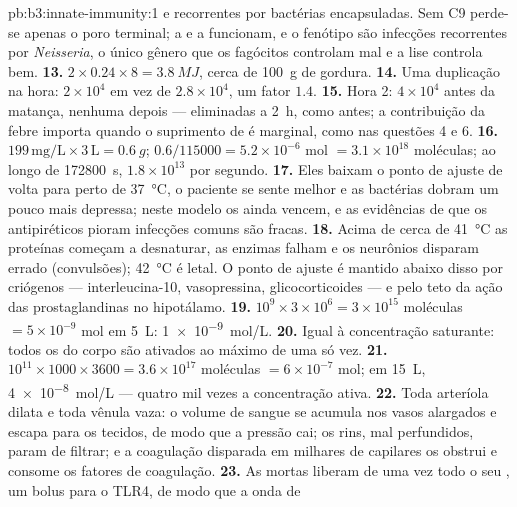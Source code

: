 \begin{solution}{pb:b3:innate-immunity:1}
e recorrentes por bactérias encapsuladas. Sem C9 perde-se apenas o poro
terminal; a  e a  funcionam, e o fenótipo são
infecções recorrentes por \emph{Neisseria}, o único gênero que os
fagócitos controlam mal e a lise controla bem.
\textbf{13.} $2\times 0.24\times 8 = \qty{3.8}{MJ}$, cerca de
\qty{100}{g} de gordura.
\textbf{14.} Uma duplicação na hora: $2\times 10^{4}$ em vez de
$2.8\times 10^{4}$, um fator $1.4$.
\textbf{15.} Hora 2: $4\times 10^{4}$ antes da matança, nenhuma depois
--- eliminadas a \qty{2}{h}, como antes; a contribuição da febre importa
quando o suprimento de  é marginal, como nas questões 4 e 6.
\textbf{16.} $199\,\text{mg/L}\times 3\,\text{L} = \qty{0.6}{g}$; $0.6/
\num{115000} = 5.2\times 10^{-6}$ mol $= 3.1\times 10^{18}$ moléculas;
ao longo de \qty{172800}{s}, $1.8\times 10^{13}$ por segundo.
\textbf{17.} Eles baixam o ponto de ajuste de volta para perto de
\qty{37}{\celsius}, o paciente se sente melhor e as bactérias dobram um
pouco mais depressa; neste modelo os  ainda vencem, e as
evidências de que os antipiréticos pioram infecções comuns são fracas.
\textbf{18.} Acima de cerca de \qty{41}{\celsius} as proteínas começam a
desnaturar, as enzimas falham e os neurônios disparam errado
(convulsões); \qty{42}{\celsius} é letal. O ponto de ajuste é mantido
abaixo disso por criógenos --- interleucina-10, vasopressina,
glicocorticoides --- e pelo teto da ação das prostaglandinas no
hipotálamo.
\textbf{19.} $10^{9}\times 3\times 10^{6} = 3\times 10^{15}$ moléculas
$= 5\times 10^{-9}$ mol em \qty{5}{L}: \qty{1e-9}{mol/L}.
\textbf{20.} Igual à concentração saturante: todos os  do
corpo são ativados ao máximo de uma só vez.
\textbf{21.} $10^{11}\times 1000\times 3600 = 3.6\times 10^{17}$ moléculas
$= 6\times 10^{-7}$ mol; em \qty{15}{L}, \qty{4e-8}{mol/L} --- quatro
mil vezes a concentração ativa.
\textbf{22.} Toda arteríola dilata e toda vênula vaza: o volume de
sangue se acumula nos vasos alargados e escapa para os tecidos, de modo
que a pressão cai; os rins, mal perfundidos, param de filtrar; e a
coagulação disparada em milhares de capilares os obstrui e consome os
fatores de coagulação.
\textbf{23.} As  mortas liberam de uma vez todo o seu
, um bolus para o TLR4, de modo que a onda de

\end{solution}
